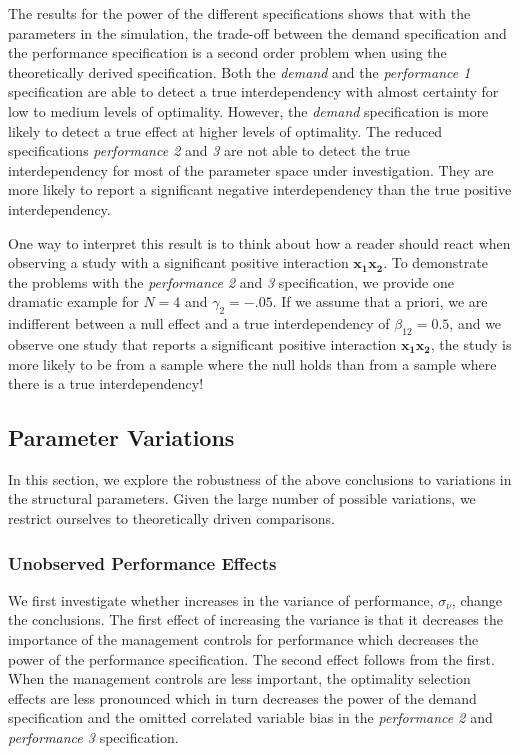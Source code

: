 \documentclass[12pt]{article}
\begin{document}
The results for the power of the different specifications shows that
with the parameters in the simulation, the trade-off between the demand
specification and the performance specification is a second order
problem when using the theoretically derived specification. Both the
\emph{demand} and the \emph{performance 1} specification are able to
detect a true interdependency with almost certainty for low to medium
levels of optimality. However, the \emph{demand} specification is more
likely to detect a true effect at higher levels of optimality. The
reduced specifications \emph{performance 2} and \emph{3} are not able to
detect the true interdependency for most of the parameter space under
investigation. They are more likely to report a significant negative
interdependency than the true positive interdependency.

One way to interpret this result is to think about how a reader should
react when observing a study with a significant positive interaction
\(\mathbf{x_1 x_2}\). To demonstrate the problems with the
\emph{performance 2} and \emph{3} specification, we provide one dramatic
example for \(N = 4\) and \(\gamma_2 = -.05\). If we assume that a
priori, we are indifferent between a null effect and a true
interdependency of \(\beta_{12} = 0.5\), and we observe one study that
reports a significant positive interaction \(\mathbf{x_{1} x_{2}}\), the
study is more likely to be from a sample where the null holds than from
a sample where there is a true interdependency!

\subsection{Parameter Variations}\label{parameter-variations}

In this section, we explore the robustness of the above conclusions to
variations in the structural parameters. Given the large number of
possible variations, we restrict ourselves to theoretically driven
comparisons.

\subsubsection{Unobserved Performance
Effects}\label{unobserved-performance-effects}

We first investigate whether increases in the variance of performance,
\(\sigma_{\nu}\), change the conclusions. The first effect of increasing
the variance is that it decreases the importance of the management
controls for performance which decreases the power of the performance
specification. The second effect follows from the first. When the
management controls are less important, the optimality selection effects
are less pronounced which in turn decreases the power of the demand
specification and the omitted correlated variable bias in the
\emph{performance 2} and \emph{performance 3} specification.
\end{document}
